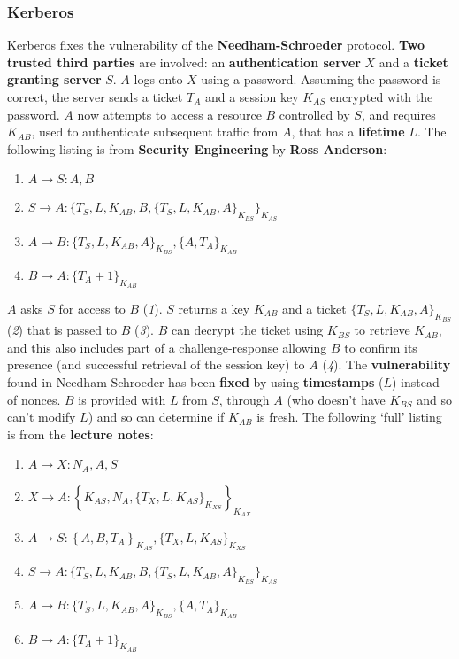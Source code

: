 \documentclass{article}
\begin{document}
\subsubsection{Kerberos}
Kerberos fixes the vulnerability of the \textbf{Needham-Schroeder} protocol. \textbf{Two trusted third parties} are involved: an \textbf{authentication server} $ X $ and a \textbf{ticket granting server} $ S $. $ A $ logs onto $ X $ using a password. Assuming the password is correct, the server sends a ticket $ T_{A} $ and a session key $ K_{AS} $ encrypted with the password. $ A $ now attempts to access a resource $ B $ controlled by $ S $, and requires $ K_{AB} $, used to authenticate subsequent traffic from $ A $, that has a \textbf{lifetime} $ L $. The following listing is from \textbf{Security Engineering} by \textbf{Ross Anderson}:
\begin{enumerate}
	\item $ A \rightarrow S : A, B $
	\item $ S \rightarrow A : \{ T_{S}, L, K_{AB}, B, \{ T_{S}, L, K_{AB}, A \}_{K_{BS}} \}_{K_{AS}} $
	\item $ A \rightarrow B : \{ T_{S}, L, K_{AB}, A \}_{K_{BS}}, \{ A, T_{A} \}_{K_{AB}} $
	\item $ B \rightarrow A : \{ T_{A} + 1 \}_{K_{AB}} $
\end{enumerate}
$ A $ asks $ S $ for access to $ B $ (\textit{1}). $ S $ returns  a key $ K_{AB} $ and a ticket $ \{ T_{S}, L, K_{AB}, A \}_{K_{BS}} $ (\textit{2}) that is passed to $ B $ (\textit{3}). $ B $ can decrypt the ticket using $ K_{BS} $ to retrieve $ K_{AB} $, and this also includes part of a challenge-response allowing $ B $ to confirm its presence (and successful retrieval of the session key) to $ A $ (\textit{4}). The \textbf{vulnerability} found in Needham-Schroeder has been \textbf{fixed} by using \textbf{timestamps} ($ L $) instead of nonces. $ B $ is provided with $ L $ from $ S $, through $ A $ (who doesn't have $ K_{BS} $ and so can't modify $ L $) and so can determine if $ K_{AB} $ is fresh. The following `full' listing is from the \textbf{lecture notes}:
\begin{enumerate}
	\item $ A \rightarrow X : N_{A}, A, S $
	\item $ X \rightarrow A : \left\lbrace K_{AS}, N_{A}, \{ T_{X}, L, K_{AS} \}_{K_{XS}} \right\rbrace_{K_{AX}} $
	\item $ A \rightarrow S : \left\lbrace A, B, T_{A} \right\rbrace_{K_{AS}}, \{ T_{X}, L, K_{AS} \}_{K_{XS}} $
	\item $ S \rightarrow A : \{ T_{S}, L, K_{AB}, B, \{ T_{S}, L, K_{AB}, A \}_{K_{BS}} \}_{K_{AS}} $
	\item $ A \rightarrow B : \{ T_{S}, L, K_{AB}, A \}_{K_{BS}}, \{ A, T_{A} \}_{K_{AB}} $
	\item $ B \rightarrow A : \{ T_{A} + 1 \}_{K_{AB}} $
\end{enumerate}
\end{document}
